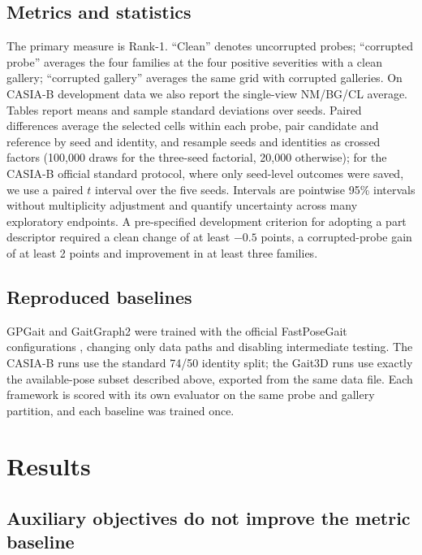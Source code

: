 \documentclass[journal]{IEEEtran}
\begin{document}
\subsection{Metrics and statistics}

The primary measure is Rank-1. ``Clean'' denotes uncorrupted probes;
``corrupted probe'' averages the four families at the four positive severities
with a clean gallery; ``corrupted gallery'' averages the same grid with
corrupted galleries. On CASIA-B development data we also report the
single-view NM/BG/CL average. Tables report means and sample standard
deviations over seeds. Paired differences average the selected cells within
each probe, pair candidate and reference by seed and identity, and resample
seeds and identities as crossed factors (100,000 draws for the three-seed
factorial, 20,000 otherwise); for the CASIA-B official standard protocol, where
only seed-level outcomes were saved, we use a paired $t$ interval over the five
seeds. Intervals are pointwise 95\% intervals without multiplicity adjustment
and quantify uncertainty across many exploratory endpoints. A pre-specified development criterion for adopting a
part descriptor required a clean change of at least $-0.5$ points, a
corrupted-probe gain of at least 2 points and improvement in at least three
families.

\subsection{Reproduced baselines}

GPGait \cite{fu2023gpgait} and GaitGraph2 \cite{teepe2022gaitgraph2} were
trained with the official FastPoseGait configurations
\cite{meng2023fastposegait}, changing only data paths and disabling
intermediate testing. The CASIA-B runs use the standard 74/50 identity split;
the Gait3D runs use exactly the available-pose subset described above,
exported from the same data file. Each framework is scored with its own
evaluator on the same probe and gallery partition, and each baseline was
trained once.

\section{Results}
\label{sec:results}

\subsection{Auxiliary objectives do not improve the metric baseline}
\end{document}
